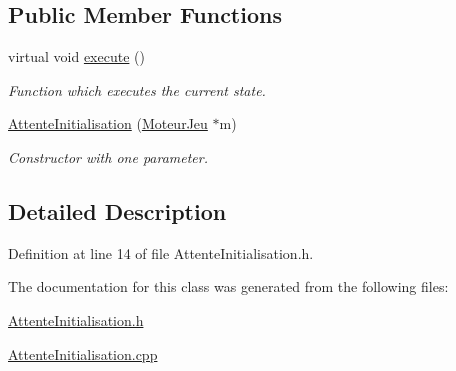 \subsection*{Public Member Functions}
\begin{DoxyCompactItemize}
\item 
\hypertarget{class_attente_initialisation_ad0dae22f706df53d6e9c60acd42533cc}{
virtual void \hyperlink{class_attente_initialisation_ad0dae22f706df53d6e9c60acd42533cc}{execute} ()}
\label{class_attente_initialisation_ad0dae22f706df53d6e9c60acd42533cc}

\begin{DoxyCompactList}\small\item\em Function which executes the current state. \item\end{DoxyCompactList}\item 
\hypertarget{class_attente_initialisation_a1f67f70578c1e757e02644f99e2fca32}{
\hyperlink{class_attente_initialisation_a1f67f70578c1e757e02644f99e2fca32}{AttenteInitialisation} (\hyperlink{class_moteur_jeu}{MoteurJeu} $\ast$m)}
\label{class_attente_initialisation_a1f67f70578c1e757e02644f99e2fca32}

\begin{DoxyCompactList}\small\item\em Constructor with one parameter. \item\end{DoxyCompactList}\end{DoxyCompactItemize}


\subsection{Detailed Description}


Definition at line 14 of file AttenteInitialisation.h.



The documentation for this class was generated from the following files:\begin{DoxyCompactItemize}
\item 
\hyperlink{_attente_initialisation_8h}{AttenteInitialisation.h}\item 
\hyperlink{_attente_initialisation_8cpp}{AttenteInitialisation.cpp}\end{DoxyCompactItemize}
